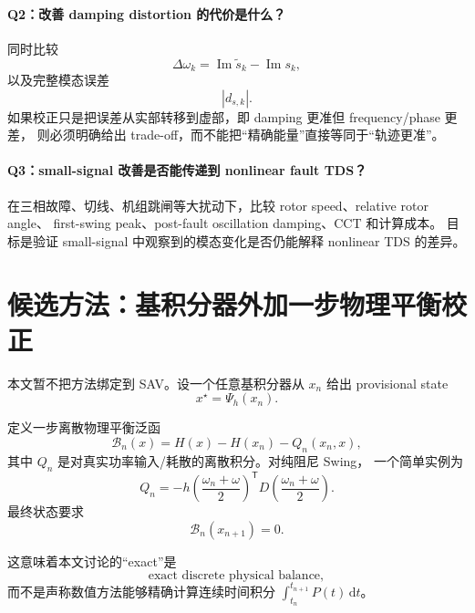 \documentclass[UTF8,11pt,a4paper]{ctexart}
\newcommand{\T}{\mathsf{T}}
\newcommand{\B}{\mathcal B}
\begin{document}
\paragraph{Q2：改善 damping distortion 的代价是什么？}
同时比较
\begin{equation}
  \Delta\omega_k
  =
  \operatorname{Im}\widetilde s_k
  -
  \operatorname{Im}s_k,
\end{equation}
以及完整模态误差
\begin{equation}
  |d_{s,k}|.
\end{equation}
如果校正只是把误差从实部转移到虚部，即 damping 更准但 frequency/phase 更差，
则必须明确给出 trade-off，而不能把“精确能量”直接等同于“轨迹更准”。

\paragraph{Q3：small-signal 改善是否能传递到 nonlinear fault TDS？}
在三相故障、切线、机组跳闸等大扰动下，比较 rotor speed、relative rotor angle、
first-swing peak、post-fault oscillation damping、CCT 和计算成本。
目标是验证 small-signal 中观察到的模态变化是否仍能解释 nonlinear TDS 的差异。

\section{候选方法：基积分器外加一步物理平衡校正}

本文暂不把方法绑定到 SAV。设一个任意基积分器从 \(x_n\) 给出 provisional state
\begin{equation}
  x^\star=\Psi_h(x_n).
  \label{eq:base-integrator}
\end{equation}

定义一步离散物理平衡泛函
\begin{equation}
  \B_n(x)
  =
  H(x)-H(x_n)-Q_n(x_n,x),
  \label{eq:balance-functional}
\end{equation}
其中 \(Q_n\) 是对真实功率输入/耗散的离散积分。对纯阻尼 Swing，
一个简单实例为
\begin{equation}
  Q_n
  =
  -h
  \left(
    \frac{\omega_n+\omega}{2}
  \right)^\T
  D
  \left(
    \frac{\omega_n+\omega}{2}
  \right).
\end{equation}
最终状态要求
\begin{equation}
  \boxed{\B_n(x_{n+1})=0.}
  \label{eq:exact-balance}
\end{equation}

这意味着本文讨论的“exact”是
\[
  \boxed{\text{exact discrete physical balance}},
\]
而不是声称数值方法能够精确计算连续时间积分
\(
\int_{t_n}^{t_{n+1}} P(t)\,\mathrm dt
\)。
\end{document}
